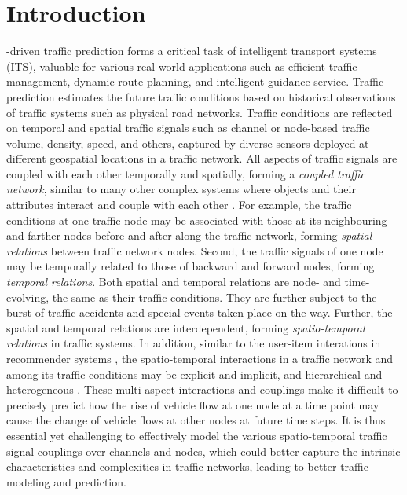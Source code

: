 \section{Introduction}
\label{sec:introduction}

-driven traffic prediction  \cite{vlahogianni2014short} forms a critical task of intelligent transport systems (ITS), valuable for various real-world applications such as efficient traffic management, dynamic route planning, and intelligent guidance service. Traffic prediction estimates the future traffic conditions based on historical observations of traffic systems such as physical road networks. Traffic conditions are reflected on temporal and spatial traffic signals such as channel or node-based traffic volume, density, speed, and others, captured by diverse sensors deployed at different geospatial locations in a traffic network. All aspects of traffic signals are coupled with each other temporally and spatially, forming a \textit{coupled traffic network}, similar to many other complex systems where objects and their attributes interact and couple with each other \cite{2015Coupling,WangGC21}. For example, the traffic conditions at one traffic node may be associated with those at its neighbouring and farther nodes before and after along the traffic network, forming \textit{spatial relations} between traffic network nodes. Second, the traffic signals of one node may be temporally related to those of backward and forward nodes, forming \textit{temporal relations}. Both spatial and temporal relations are node- and time-evolving, the same as their traffic conditions. They are further subject to the burst of traffic accidents and special events taken place on the way. Further, the spatial and temporal relations are interdependent, forming \textit{spatio-temporal relations} in traffic systems. In addition, similar to the user-item interations in recommender systems \cite{cao2016non}, the spatio-temporal interactions in a traffic network and among its traffic conditions may be explicit and implicit, and hierarchical and heterogeneous \cite{zhu2020unsupervised}. These multi-aspect interactions and couplings make it difficult to precisely predict how the rise of vehicle flow at one node at a time point may cause the change of vehicle flows at other nodes at future time steps. It is thus essential yet challenging to effectively model the various spatio-temporal traffic signal couplings over channels and nodes, which could better capture the intrinsic characteristics and complexities in traffic networks, leading to better traffic modeling and prediction.

